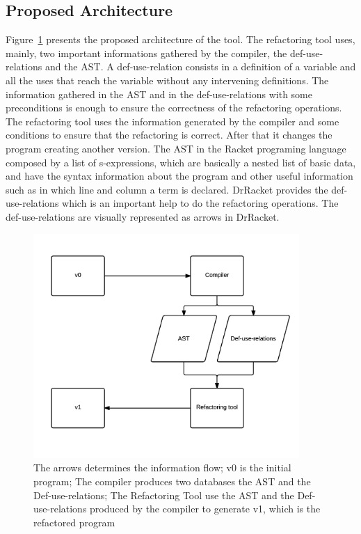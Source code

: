 \subsection{Proposed Architecture}

Figure~\ref{fig:architecture} presents the proposed architecture of the tool. 
The refactoring tool uses, mainly, two important informations gathered by the compiler, the def-use-relations and the AST.
A def-use-relation consists in a definition of a variable and all the uses that reach the variable without any intervening definitions.
The information gathered in the AST and in the def-use-relations with some preconditions is enough to ensure the correctness of the refactoring operations.
The refactoring tool uses the information generated by the compiler and some conditions to ensure that the refactoring is correct. After that it changes the program creating another version.
The AST in the Racket programing language composed by a list of s-expressions, which are basically a nested list of basic data, and have the syntax information about the program and other useful information such as in which line and column a term is declared.
DrRacket provides the def-use-relations which is an important help to do the refactoring operations. 
The def-use-relations are visually represented as arrows in DrRacket.

\begin{figure}[htbp]
	\centering
	\includegraphics[width=0.9\textwidth]{img/arquitectura.png}
	\caption{The arrows determines the information flow; v0 is the initial program; The compiler produces two databases the AST and the Def-use-relations; The Refactoring Tool use the AST and the Def-use-relations produced by the compiler to generate v1, which is the refactored program}
	\label{fig:architecture}
\end{figure}


